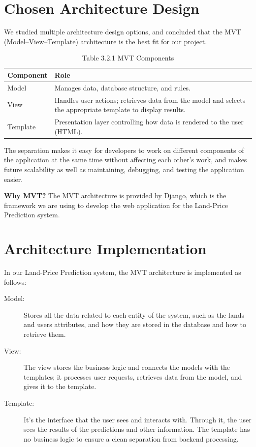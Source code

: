 \documentclass[12pt,oneside]{report}
\begin{document}
\section{Chosen Architecture Design}
\noindent\justifying
We studied multiple architecture design options, and concluded that the MVT (Model–View–Template) architecture is the best fit for our project.

\begin{table}[H]
\centering
\caption{Table 3.2.1 MVT Components}
\label{tab:mvt-components}
\setlength{\arrayrulewidth}{0.6pt}   %
\renewcommand{\arraystretch}{1.25}   %
\begin{tabularx}{\textwidth}{|>{\raggedright\arraybackslash}p{3.2cm}|X|}
\hline
\textbf{Component} & \textbf{Role} \\ \hline
Model    & Manages data, database structure, and rules. \\ \hline
View     & Handles user actions; retrieves data from the model and selects the appropriate template to display results. \\ \hline
Template & Presentation layer controlling how data is rendered to the user (HTML). \\ \hline
\end{tabularx}
\end{table}


The separation makes it easy for developers to work on different components of the application at the same time without affecting each other's work, and makes future scalability as well as maintaining, debugging, and testing the application easier.

\noindent\textbf{Why MVT?} The MVT architecture is provided by Django, which is the framework we are using to develop the web application for the Land-Price Prediction system.


\section{Architecture Implementation}
In our Land-Price Prediction system, the MVT architecture is implemented as follows:

\begin{description}
    \item[Model:] Stores all the data related to each entity of the system, such as the lands and users attributes, and how they are stored in the database and how to retrieve them.
    
    \item[View:] The view stores the business logic and connects the models with the templates; it processes user requests, retrieves data from the model, and gives it to the template.
    
    \item[Template:] It's the interface that the user sees and interacts with. Through it, the user sees the results of the predictions and other information. The template has no business logic to ensure a clean separation from backend processing.
\end{description}
\end{document}
